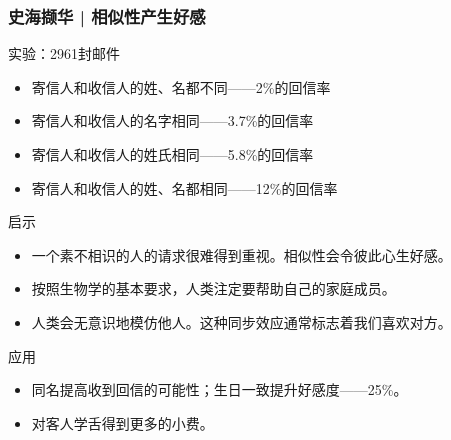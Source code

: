 \begin{frame}
  \frametitle{史海撷华 | 相似性产生好感}
  \begin{block}{实验：2961封邮件}
    \begin{itemize}
      \item 寄信人和收信人的姓、名都不同——2\%的回信率
      \item 寄信人和收信人的名字相同——3.7\%的回信率
      \item 寄信人和收信人的姓氏相同——5.8\%的回信率
      \item 寄信人和收信人的姓、名都相同——12\%的回信率
    \end{itemize}
  \end{block}
  \vspace{-0.5em}
  \pause
  \begin{block}{启示}
    \begin{itemize}
      \item 一个素不相识的人的请求很难得到重视。相似性会令彼此心生好感。
      \item 按照生物学的基本要求，人类注定要帮助自己的家庭成员。
      \item 人类会无意识地模仿他人。这种同步效应通常标志着我们喜欢对方。
    \end{itemize}
  \end{block}
  \vspace{-0.5em}
  \pause
  \begin{block}{应用}
    \begin{itemize}
      \item 同名提高收到回信的可能性；生日一致提升好感度——25\%。
      \item 对客人学舌得到更多的小费。
    \end{itemize}
  \end{block}
\end{frame}

